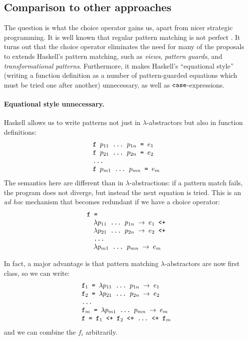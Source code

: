 \documentclass[fleqn]{article}
\newcommand{\ve}[1]{\ensuremath{\text{\tt #1}}}
\newcommand{\ra}{\ensuremath{\rightarrow} }
\begin{document}
\subsection{Comparison to other approaches}

The question is what the choice operator gains us, apart from nicer
strategic programming.  It is well known that regular pattern matching
is not perfect \cite{firstclasspatterns, patternguards}.
It turns out that the choice operator
eliminates the need for many of the proposals to extends Haskell's
pattern matching, such as {\em views}, {\em pattern guards}, and {\em
  transformational patterns}.
Furthermore, it makes Haskell's ``equational style'' (writing a
function definition as a number of pattern-guarded equations which
must be tried one after another) unnecessary, as well as
\ve{case}-expressions.


\paragraph{Equational style unnecessary.}

Haskell allows us to write patterns not just in $\lambda$-abstractors
but also in function definitions: 
\[
\begin{array}{l}
\ve{f $p_{11}$ \ldots\ $p_{1n}$ = $e_1$} \\
\ve{f $p_{21}$ \ldots\ $p_{2n}$ = $e_2$} \\
\ve{\ldots} \\
\ve{f $p_{m1}$ \ldots\ $p_{mn}$ = $e_m$}
\end{array}
\]
The semantics here are different than in $\lambda$-abstractions: if a
pattern match fails, the program does not diverge, but instead the
next equation is tried.  This is an {\em ad hoc} mechanism that
becomes redundant if we have a choice operator:
\[
\begin{array}{l}
\ve{f = } \\
\quad \ve{$\lambda p_{11}$ \ldots\ $p_{1n}$ \ra $e_1$ <+} \\
\quad \ve{$\lambda p_{21}$ \ldots\ $p_{2n}$ \ra $e_2$ <+} \\
\quad \ve{\ldots} \\
\quad \ve{$\lambda p_{m1}$ \ldots\ $p_{mn}$ \ra $e_m$}
\end{array}
\]

In fact, a major advantage is that pattern matching
$\lambda$-abstractors are now first class, so we can write:
\[
\begin{array}{l}
\ve{$\ve{f}_1$ = $\lambda p_{11}$ \ldots\ $p_{1n}$ \ra $e_1$} \\
\ve{$\ve{f}_2$ = $\lambda p_{21}$ \ldots\ $p_{2n}$ \ra $e_2$} \\
\ve{\ldots} \\
\ve{$\ve{f}_m$ = $\lambda p_{m1}$ \ldots\ $p_{mn}$ \ra $e_m$} \\
\ve{f = $\ve{f}_1$ <+ $\ve{f}_2$ <+ \ldots\ <+ $\ve{f}_m$}
\end{array}
\]
and we can combine the $f_i$ arbitrarily.
\end{document}
